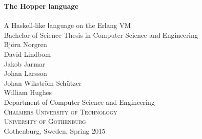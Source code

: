 
\begin{titlepage}
			
\addtolength{\voffset}{2cm}


\mbox{}
\vfill
\renewcommand{\familydefault}{\sfdefault} \normalfont %
\textbf{{\Huge	The Hopper language 	\\[0.2cm] 
				}} 	\\[0.5cm]
{\Large A Haskell-like language on the Erlang VM}\\[0.5cm]
Bachelor of Science Thesis in Computer Science and Engineering \\[0.5cm]

{\Large 
  Björn Norgren \\
  David Lindbom \\
  Jakob Jarmar   \\
  Johan Larsson \\
  Johan Wikström Schützer \\
  William Hughes }\\[2.0cm]


Department of Computer Science and Engineering \\
\textsc{Chalmers University of Technology} \\
\textsc{University of Gothenburg} \\
Gothenburg, Sweden, Spring 2015

\renewcommand{\familydefault}{\rmdefault} \normalfont %
\end{titlepage}


\newpage
\restoregeometry
\thispagestyle{empty}
\mbox{}



